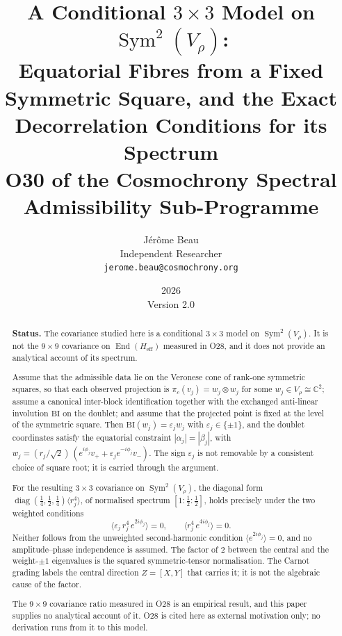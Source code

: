 \documentclass[11pt,a4paper]{article}
\title{A Conditional $3\times3$ Model on $\operatorname{Sym}^2(V_{\rho})$:\\
Equatorial Fibres from a Fixed Symmetric Square, and the Exact Decorrelation
Conditions for its Spectrum\\[6pt]
{\large O30 of the Cosmochrony Spectral Admissibility Sub-Programme}}
\author{J\'{e}r\^{o}me Beau\\[4pt]
\small Independent Researcher\\
\small \texttt{jerome.beau@cosmochrony.org}}
\date{2026\\[2pt]\small Version 2.0}
\DeclareMathOperator{\Sym}{Sym}
\DeclareMathOperator{\End}{End}
\newcommand{\Heff}{H_{\mathrm{eff}}}
\newcommand{\BI}{\mathrm{BI}}
\begin{document}
  \maketitle

  \begin{abstract}
    \noindent\textbf{Status.}
    The covariance studied here is a conditional $3\times3$ model on $\Sym^2(V_\rho)$.
    It is not the $9\times9$ covariance on $\End(\Heff)$ measured in O28, and it
    does not provide an analytical account of its spectrum.

    Assume that the admissible data lie on the Veronese cone of rank-one symmetric squares, so that
    each observed projection is $\pi_c(v_j) = w_j \otimes w_j$ for some $w_j \in V_\rho \cong
    \mathbb{C}^2$; assume a canonical inter-block identification together with the exchanged
    anti-linear involution $\BI$ on the doublet; and assume that the projected point is fixed at the
    level of the symmetric square.
    Then $\BI(w_j) = \varepsilon_j w_j$ with $\varepsilon_j \in \{\pm 1\}$, and the doublet
    coordinates satisfy the equatorial constraint $|\alpha_j| = |\beta_j|$, with
    $w_j = (r_j/\!\sqrt{2})\,(e^{i\phi_j} v_+ + \varepsilon_j e^{-i\phi_j} v_-)$.
    The sign $\varepsilon_j$ is not removable by a consistent choice of square root; it is carried
    through the argument.

    For the resulting $3\times3$ covariance on $\Sym^2(V_\rho)$, the diagonal form
    $\operatorname{diag}(\tfrac14,\tfrac12,\tfrac14)\langle r_j^4 \rangle$, of normalised spectrum
    $[1 : \tfrac{1}{2} : \tfrac{1}{2}]$, holds precisely under the two weighted conditions
    \[
      \bigl\langle \varepsilon_j\, r_j^4\, e^{2i\phi_j} \bigr\rangle = 0,
      \qquad
      \bigl\langle r_j^4\, e^{4i\phi_j} \bigr\rangle = 0 .
    \]
    Neither follows from the unweighted second-harmonic condition
    $\langle e^{2i\phi_j}\rangle = 0$, and no amplitude--phase independence is assumed.
    The factor of $2$ between the central and the weight-$\pm1$ eigenvalues is the squared
    symmetric-tensor normalisation.
    The Carnot grading labels the central direction $Z=[X,Y]$ that carries it; it is not the
    algebraic cause of the factor.

    The $9\times9$ covariance ratio measured in O28 is an empirical result, and this paper supplies
    no analytical account of it.
    O28 is cited here as external motivation only; no derivation runs from it to this model.
  \end{abstract}
\end{document}
